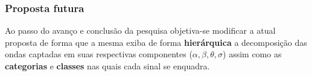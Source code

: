 \begin{frame}
	\frametitle{Proposta futura}
	\par Ao passo do avanço e conclusão da pesquisa objetiva-se modificar a atual proposta de forma que a mesma exiba de forma \textbf{hierárquica} a decomposição das ondas captadas em suas respectivas componentes ($\alpha, \beta, \theta, \sigma$) assim como as \textbf{categorias} e \textbf{classes} nas quais cada sinal se enquadra.
\end{frame}